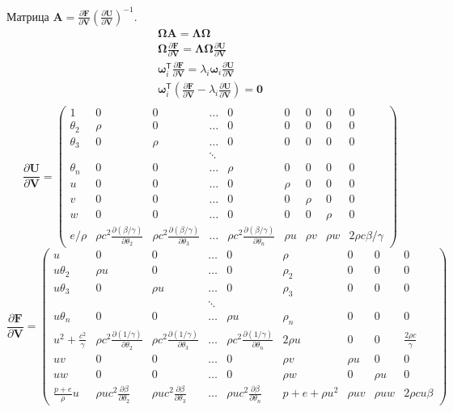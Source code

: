 \documentclass[12pt]{article}
\newcommand{\pd}[2]{\frac{\partial #1}{\partial #2}}
\newcommand{\bvec}[1]{\boldsymbol{\mathbf{#1}}}
\newcommand{\tr}{\mathsf{T}}
\begin{document}
Матрица $\bvec A = \pd{\bvec F}{\bvec V} \left(\pd{\bvec U}{\bvec V}\right)^{-1}$. 
\begin{gather*}
\bvec \Omega \bvec A = \bvec \Lambda \bvec \Omega\\
\bvec \Omega \pd{\bvec F}{\bvec V} 
= \bvec \Lambda \bvec \Omega\pd{\bvec U}{\bvec V} \\
\bvec \omega_i^\tr \pd{\bvec F}{\bvec V} 
= \lambda_i \bvec \omega_i \pd{\bvec U}{\bvec V} \\
\bvec \omega_i^\tr \left(\pd{\bvec F}{\bvec V} - \lambda_i \pd{\bvec U}{\bvec V}\right) = \bvec 0\\
\end{gather*}
\[
\pd{\bvec U}{\bvec V} = 
\begin{pmatrix}
1 & 0 & 0 & \dots & 0 & 0 & 0 & 0 & 0\\
\theta_2 & \rho & 0 & \dots & 0 & 0 & 0 & 0 & 0\\
\theta_3 & 0 & \rho & \dots & 0 & 0 & 0 & 0 & 0\\
 &  &  & \ddots\\
\theta_n & 0 & 0 & \dots & \rho & 0 & 0 & 0 & 0\\ 
u & 0 & 0 & \dots & 0 & \rho & 0 & 0 & 0\\ 
v & 0 & 0 & \dots & 0 & 0 & \rho & 0 & 0\\ 
w & 0 & 0 & \dots & 0 & 0 & 0 & \rho & 0\\ 
e / \rho & \rho c^2 \pd{(\beta/\gamma)}{\theta_2} & \rho c^2 \pd{(\beta/\gamma)}{\theta_3} & \dots 
& \rho c^2 \pd{(\beta/\gamma)}{\theta_n} & \rho u & \rho v & \rho w & 2\rho c \beta/\gamma
\end{pmatrix}
\]
\[
\pd{\bvec F}{\bvec V} = 
\begin{pmatrix}
u & 0 & 0 & \dots & 0 & \rho & 0 & 0 & 0\\
u\theta_2 & \rho u & 0 & \dots & 0 & \rho_2 & 0 & 0 & 0\\
u\theta_3 & 0 & \rho u & \dots & 0 & \rho_3 & 0 & 0 & 0\\
 &  &  & \ddots\\
u\theta_n & 0 & 0 & \dots & \rho u & \rho_n & 0 & 0 & 0\\ 
u^2 + \frac{c^2}{\gamma} & 
\rho c^2\pd{(1/\gamma)}{\theta_2} & 
\rho c^2\pd{(1/\gamma)}{\theta_3} & 
\dots & 
\rho c^2\pd{(1/\gamma)}{\theta_n} & 
2\rho u & 0 & 0 & \frac{2\rho c}{\gamma} \\ 
u v & 0 & 0 & \dots & 0 & \rho v & \rho u & 0 & 0\\ 
u w & 0 & 0 & \dots & 0 & \rho w & 0 & \rho u & 0\\ 
\frac{p+e}{\rho}u & 
\rho u c^2 \pd{\beta}{\theta_2} & 
\rho u c^2 \pd{\beta}{\theta_3} & \dots & 
\rho u c^2 \pd{\beta}{\theta_n} & p + e + \rho u^2 & \rho uv & \rho uw & 2\rho c u\beta
\end{pmatrix}
\]
\end{document}
